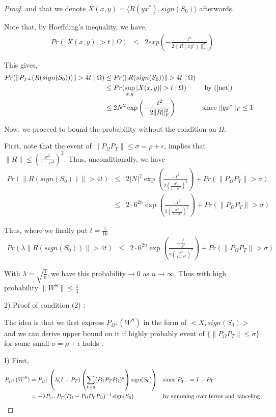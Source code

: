\begin{proof}
and that we denote $X(x,y)= \langle R(yx^{*}),sign(S_{0}) \rangle$ afterwards.

Note that, by Hoeffding's inequality, we have,
\begin{eqnarray*}
Pr(|X(x,y)|>t\mid\Omega) & \le & 2exp(-\frac{t^{2}}{2\|R(xy^{*})\|_{F}^{2}})
\end{eqnarray*}


This gives,
\begin{align*}
Pr(\|P_{T^{\bot}}(R(sign(S_{0})))\| > 4t\mid\Omega)
& \le Pr(\|R(sign(S_{0}))\| > 4t\mid\Omega)\\
& \le Pr(\sup_{x,y}|X(x,y)|>t\mid\Omega)
&& \text{ by (\ref{net})}\\
& \le 2N^{2}\exp \left( -\frac{t^{2}}{2\|R\|_{F}^{2}} \right)
&& \text{since } \|yx^{*}\|_{F} \le 1
\end{align*}


Now, we proceed to bound the probability without the condition on $\Omega$.

First, note that the event of $\|P_{\Omega}P_{T}\|\le\sigma=\rho+\epsilon$, implies that $\|R\|\le(\frac{\sigma^{2}}{1-\sigma^{2}})^{2}$. Thus, unconditionally, we have
\begin{eqnarray*}
Pr(\|R(sign(S_{0}))\|>4t) & \le & 2|N|^{2} \exp \left( \frac{-t^{2}}{2(\frac{\sigma^{2}}{1-\sigma^{2}})^{2}} \right) + Pr(\|P_{\Omega}P_{T}\|>\sigma)\\
 & \le & 2\cdot6^{2n} \exp \left( \frac{-t^{2}}{2(\frac{\sigma^{2}}{1-\sigma^{2}})^{2}} \right) + Pr(\|P_{\Omega}P_{T}\|>\sigma)
\end{eqnarray*}


Thus, where we finally put $t=\frac{1}{16}$
\begin{eqnarray*}
Pr(\lambda\|R(sign(S_{0}))\|>4t) & \le & 2\cdot6^{2n} \exp \left( \frac{-\frac{t^{2}}{\lambda^{2}}}{2(\frac{\sigma^{2}}{1-\sigma^{2}})^{2}} \right) + Pr(\|P_{\Omega}P_{T}\| > \sigma)
\end{eqnarray*}


With $\lambda=\sqrt{\frac{1}{n}},$we have this probability$\to0$ as $n\to\infty$. Thus with high probability $\|W^{S}\|\le\frac{1}{4}$

2) Proof of condition (2) :

The idea is that we first express $P_{\Omega^{\bot}}(W^{S})$ in the form of $<X,sign(S_{0})>$and we can derive upper bound on it if highly probably event of $\{\|P_{\Omega}P_{T}\|\le\sigma\}$ for some small $\sigma=\rho+\epsilon$ holds .

I) First,
\begin{align}
P_{\Omega^{\bot}}(W^{S})
& = P_{\Omega^{\bot}} \left( \lambda(I-P_{T}) \left( \sum_{k\ge0}(P_{\Omega}P_{T}P_{\Omega})^{k} \right) \operatorname{sign}(S_{0}) \right)
&& \text{since } P_{T^{\bot}} = I- P_T\\
& = -\lambda P_{\Omega^{\bot}} P_{T}(P_{\Omega}-P_{\Omega}P_{T}P_{\Omega})^{-1} \operatorname{sign}(S_{0})
&&\text{by  summing over terms and canceling}
\label{wsp1}
\end{align}



\end{proof}
